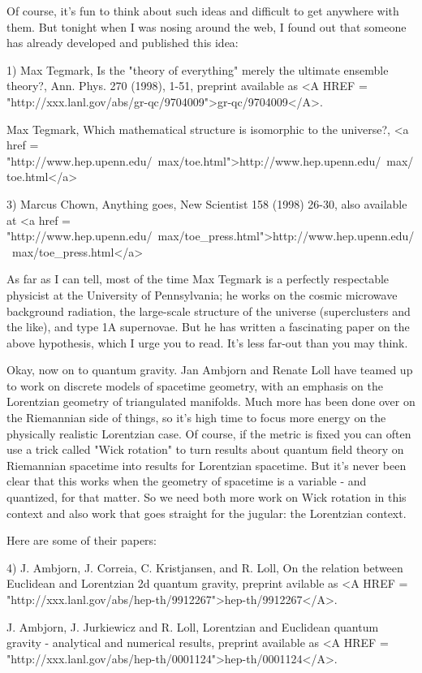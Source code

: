 Of course, it's fun to think about such ideas and difficult to get
anywhere with them.  But tonight when I was nosing around the web, I
found out that someone has already developed and published this idea:

1) Max Tegmark, Is the "theory of everything" merely the ultimate
ensemble theory?, Ann. Phys. 270 (1998), 1-51, preprint available
as <A HREF = "http://xxx.lanl.gov/abs/gr-qc/9704009">gr-qc/9704009</A>.

Max Tegmark, Which mathematical structure is isomorphic to the
universe?, <a href = "http://www.hep.upenn.edu/~max/toe.html">http://www.hep.upenn.edu/~max/toe.html</a>

3) Marcus Chown, Anything goes, New Scientist 158 (1998) 26-30, also
available at <a href = "http://www.hep.upenn.edu/~max/toe_press.html">http://www.hep.upenn.edu/~max/toe_press.html</a>

As far as I can tell, most of the time Max Tegmark is a perfectly
respectable physicist at the University of Pennsylvania; he works on 
the cosmic microwave background radiation, the large-scale structure
of the universe (superclusters and the like), and type 1A supernovae.
But he has written a fascinating paper on the above hypothesis, which
I urge you to read.  It's less far-out than you may think.

Okay, now on to quantum gravity.  Jan Ambjorn and Renate Loll have
teamed up to work on discrete models of spacetime geometry, with an
emphasis on the Lorentzian geometry of triangulated manifolds.  Much
more has been done over on the Riemannian side of things, so it's high
time to focus more energy on the physically realistic Lorentzian case.
Of course, if the metric is fixed you can often use a trick called "Wick
rotation" to turn results about quantum field theory on Riemannian
spacetime into results for Lorentzian spacetime.  But it's never been
clear that this works when the geometry of spacetime is a variable - and
quantized, for that matter.  So we need both more work on Wick rotation
in this context and also work that goes straight for the jugular: the
Lorentzian context.

Here are some of their papers:

4) J. Ambjorn, J. Correia, C. Kristjansen, and R. Loll, On the
relation between Euclidean and Lorentzian 2d quantum gravity, 
preprint avilable as <A HREF = "http://xxx.lanl.gov/abs/hep-th/9912267">hep-th/9912267</A>.

J. Ambjorn, J. Jurkiewicz and R. Loll, Lorentzian and Euclidean
quantum gravity - analytical and numerical results, preprint available
as <A HREF = "http://xxx.lanl.gov/abs/hep-th/0001124">hep-th/0001124</A>. 

